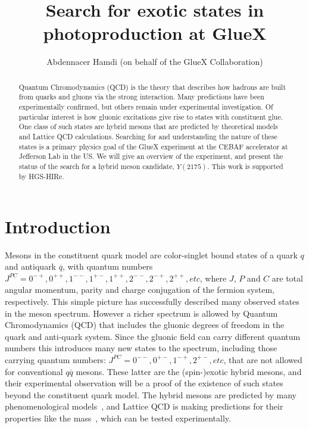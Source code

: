 \documentclass[a4paper]{jpconf}
\begin{document}
\title{Search for exotic states in photoproduction at GlueX}

\author{Abdennacer Hamdi (on behalf of the GlueX Collaboration)}

\address{GSI Helmholtzzentrum f\"ur Schwerionenforschung GmbH, Planckstr. 1, 64291 Darmstadt, Germany}


\begin{abstract}
    Quantum Chromodynamics (QCD) is the theory that describes how hadrons are built from quarks and gluons via the strong interaction. Many predictions have been experimentally confirmed, but others remain under experimental investigation. Of particular interest is how gluonic excitations give rise to states with constituent glue. One class of such states are hybrid mesons that are predicted by theoretical models and Lattice QCD calculations. Searching for and understanding the nature of these states is a primary physics goal of the GlueX experiment at the CEBAF accelerator at Jefferson Lab in the US. We will give an overview of the experiment, and present the status of the search for a hybrid meson candidate, $Y(2175)$. This work is supported by HGS-HIRe.
\end{abstract}

\section{Introduction}
Mesons in the constituent quark model are color-singlet bound states of a quark $q$ and antiquark $\overline{q}$, with quantum numbers $J^{PC} = 0^{-+}, 0^{++}, 1^{--}, 1^{+-}, 1^{++}, 2^{--}, 2^{-+}, 2^{++}, etc$, where $J$, $P$ and $C$ are total angular momentum, parity and charge conjugation of the fermion system, respectively. This simple picture has successfully described many observed states in the meson spectrum. However a richer spectrum is allowed by Quantum Chromodynamics (QCD) that includes the gluonic degrees of freedom in the quark and anti-quark system. Since the gluonic field can carry different quantum numbers this introduces many new states to the spectrum, including those carrying quantum numbers: $J^{PC} = 0^{--}, 0^{+-}, 1^{-+}, 2^{+-}, etc$, that are not allowed for conventional $q\overline{q}$ mesons. These latter are the (spin-)exotic hybrid mesons, and their experimental observation will be a proof of the existence of such states beyond the constituent quark model. The hybrid mesons are predicted by many phenomenological models~\cite{ref.1}, and Lattice QCD is making predictions for their properties like the mass~\cite{ref.2}, which can be tested experimentally.
\end{document}

